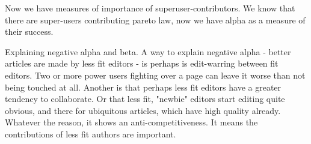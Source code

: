 \documentclass{acm_proc_article-sp}
\begin{document}
Now we have measures of importance of superuser-contributors. We know that there are super-users contributing pareto law, now we have alpha as a measure of their success.

Explaining negative alpha and beta.
A way to explain negative alpha - better articles are made by less fit editors - is perhaps is edit-warring between fit editors. Two or more power users fighting over a page can leave it worse than not being touched at all. Another is that perhaps less fit editors have a greater tendency to collaborate. Or that less fit, "newbie" editors start editing quite obvious, and there for ubiquitous articles, which have high quality already.  Whatever the reason,  it shows an anti-competitiveness. It means the contributions of less fit authors are important. 





  

%
%
\end{document}
